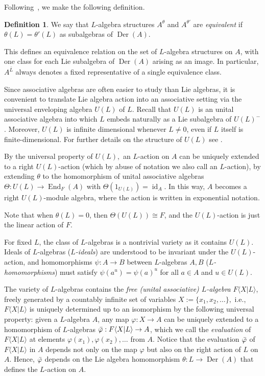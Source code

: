 \documentclass[a4paper,reqno]{amsart}
\theoremstyle{definition}
\newtheorem{definition}[theorem]{Definition}
\numberwithin{equation}{section}
\numberwithin{theorem}{section}
\newcommand{\FL}{F\langle X|L\rangle}
\DeclareMathOperator{\D}{Der}
\DeclareMathOperator{\id}{id}
\DeclareMathOperator{\E}{End}
\begin{document}
Following~\cite[Definition~4.1]{AGV}, we make the following definition.

\begin{definition}\label{def: equivalence}
We say that $L$-algebra structures $A^\theta$ and
$A^{\theta'}$ are \emph{equivalent} if $\theta(L)=\theta'(L)$ as subalgebras of $\D(A)$.
\end{definition}
 This defines an equivalence relation on the set of $L$-algebra structures on $A$, with one class for each Lie subalgebra of $\D(A)$ arising as an
image. In particular, $A^{\bar L}$ always denotes a fixed representative of a single
equivalence class.





\smallskip


 
Since associative algebras are often easier to study than Lie algebras, it is convenient to translate Lie algebra action into an associative setting via the universal enveloping algebra $U(L)$ of $L$.
Recall that $U(L)$ is an unital associative algebra into which $ L$ embeds naturally as a Lie subalgebra of $U(L)^-$. Moreover, $U(L)$ is infinite dimensional whenever $L\neq 0$, even if $L$ itself is finite-dimensional.
For further details on the structure of $U(L)$ see \cite[Section 17]{Humphreys1972}.

By the universal property of $U(L),$ an $L$-action on $A$ can be uniquely extended to a right $U(L)$-action (which by abuse of notation we also call an $L$-action), by extending $\theta$ to the homomorphism of unital associative algebras $\Theta\colon U(L)\to\E_F(A)$ with $\Theta(1_{U(L)})=\id_A$.  In this way, $A$ becomes a right $U(L)$-module algebra, where the action is written in exponential notation. 

Note that when $\theta(L)=0$, then $\Theta(U(L))\cong F$, and the $U(L)$-action is just the linear action of $F$.

\smallskip

For fixed $L$, the class of $L$-algebras is a nontrivial variety as it contains $U(L)$. Ideals of $L$-algebras (\textit{$L$-ideals}) are understood to be invariant under the $U(L)$-action, and homomorphisms $\psi:A\rightarrow B$ between $L$-algebras $A,B$ (\textit{$L$-homomorphisms}) must satisfy $\psi(a^u)=\psi(a)^u$ for all $a\in A$ and  $u\in U(L)$.


The variety of $L$-algebras contains the \textit{free (unital associative) $L$-algebra} $\FL$, freely generated by a countably infinite set of variables $X:=\{x_1,x_2, \dots\},$ i.e., $\FL$ is uniquely determined up to an isomorphism by the following universal property: given a $L$-algebra $A$, any map $\varphi: X\rightarrow A$ can be uniquely extended to a homomorphism of $L$-algebras $\Bar{\varphi}:\FL\rightarrow A$, which we call the \textit{evaluation} of $\FL$ at elements $\varphi(x_1),\varphi(x_2),\ldots$ from $A$. Notice that the evaluation $\Bar{\varphi}$ of $\FL$ in $A$ depends not only on the map $\varphi$ but also on the right action of $L$ on $A.$ Hence, $\Bar{\varphi}$ depends on the Lie algebra homomorphism $\theta:L \to \D(A)$ that defines the $L$-action on $A.$
\end{document}
